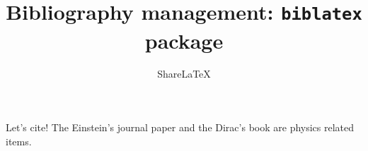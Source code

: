 \documentclass{tufte-book}
\title{Bibliography management: \texttt{biblatex} package}
\author{Share\LaTeX}
\date{ }
\begin{document}
 
\maketitle
 
 
 

Let's cite! The Einstein's journal paper \cite{einstein} and the Dirac's 
book \cite{dirac} are physics related items. 

\printbibliography[title={Whole bibliography}]
\end{document}
